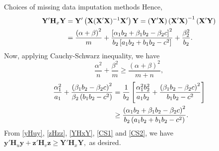 \begin{frame}{Choices of missing data imputation methods}
Hence, 
\begin{align}\label{YHxY}
        \mathbf{Y}'\mathbf{H}_x \mathbf{Y} &=  \mathbf{Y}'\left(\mathbf{X}(\mathbf{X}'\mathbf{X})^{-1}\mathbf{X}'\right) \mathbf{Y}
        = \left(\mathbf{Y}'\mathbf{X}\right)\left(\mathbf{X}'\mathbf{X}\right)^{-1} \left(\mathbf{X}'\mathbf{Y}\right)\notag\\
        &= \frac{\left(\alpha + \beta\right)^2}{m} + \frac{\left[\alpha_1b_2+\beta_1b_2-\beta_2c\right]^2}{b_2\left[a_1b_2+b_1b_2-c^2\right]} + \frac{\beta_2^2}{b_2}.
    \end{align}
Now, applying Cauchy-Schwarz inequality, we have
\begin{equation}
        \frac{\alpha^2}{n} +\frac{\beta^2}{m}\ge \frac{\left(\alpha+\beta\right)^2}{m+n},\label{CS1}
    \end{equation}
\begin{align}\label{CS2}
        \frac{\alpha_1^2}{a_1} + \frac{\left(\beta_1b_2-\beta_2c\right)^2}{\beta_2\left(b_1b_2-c^2\right)} &= \frac{1}{b_2}\left[\frac{\alpha_1^2b_2^2}{a_1b_2} +\frac{\left(\beta_1b_2-\beta_2c\right)^2}{b_1b_2-c^2}\right]\notag\\
        &\ge \frac{\left(\alpha_1b_2+\beta_1b_2-\beta_2c\right)^2}{b_2\left(a_1b_2+b_1b_2-c^2\right)}.
    \end{align}
From \eqref{yHuy}, \eqref{zHzz}, \eqref{YHxY}, \eqref{CS1} and \eqref{CS2}, we have
    $\mathbf{y}'\mathbf{H}_u \mathbf{y}+\boldsymbol{z}'\mathbf{H}_v \boldsymbol{z}\ge \mathbf{Y}'\mathbf{H}_x \mathbf{Y},$ as desired.
\end{frame}